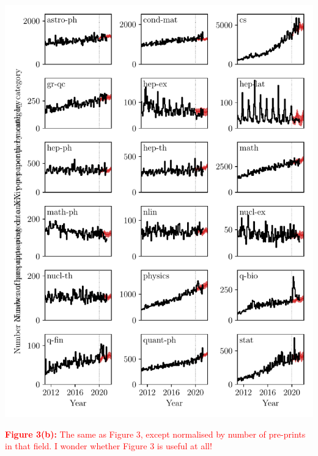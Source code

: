 \documentclass[a4paper,12pt]{article}
\newcommand{\todo}[1]{\textcolor{red}{#1}}
\begin{document}

\newpage


\begin{center}
	\includegraphics[width=0.95\linewidth]{new-authors-segmented-by-field-normalised}
\end{center}

\noindent \todo{\textbf{Figure 3(b):} The same as Figure 3, except normalised by number of pre-prints in that field. I wonder whether Figure 3 is useful at all!}

\newpage
\end{document}
